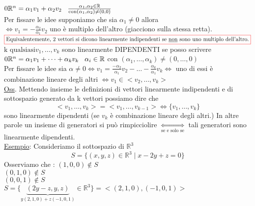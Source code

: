 \(
0\mathbb{R}^n = \alpha_1 v_1 + \alpha_2 v_2 \hspace{.3cm} \frac{\alpha_1,\alpha_2 \in \mathbb{R}}{\text{con} (\alpha_1,\alpha_2) \neq (0,0)}
\)\\
\textsf{\small Per fissare le idee supponiamo che sia $\alpha_1 \neq 0$ allora}\\
$\Leftrightarrow v_1 = - \frac{\alpha_2}{\alpha_1}v_2$ uno è multiplo dell'altro (giacciono sulla stessa retta).\\
$\color{red}\boxed{\normalcolor \text{Equivalentemente, 2 vettori si dicono linearmente indipendenti se \underline{non} sono uno multiplo dell'altro.}}$\\

$\boxed{\text{k qualsiasi}} v_1, \dots, v_k $ sono linearmente DIPENDENTI se posso scrivere $0\mathbb{R}^n = \alpha_1 v_1 + \dots + \alpha_k v_k \hspace{0.3cm} \alpha_i \in \mathbb{R}$ con $ (\alpha_1,\dots,\alpha_k) \neq (0,\dots,0)$\\
\textsf{\small Per fissare le idee sia $\alpha \neq 0 \Leftrightarrow v_1 = \frac{-\alpha_2}{\alpha_1}v_2 - \dots - \frac{\alpha_k}{\alpha_1}v_k \Leftrightarrow$ uno di essi è combinazione lineare degli altri $\Leftrightarrow v_1 \in <v_2,\dots,v_k>$}\\
\textsf{\small \underline{Oss}. Mettendo insieme le definizioni di vettori linearmente indipendenti e di sottospazio generato da k vettori possiamo dire che}
\[
<v_1,\dots,v_k> = <v_1,\dots,v_{k-1}> \Leftrightarrow \{ v_1, \dots, v_k\}
\]
\textsf{\small sono linearmente dipendenti (se $v_k$ è combinazione lineare degli altri.) In altre parole un insieme di generatori si può rimpicciolire $\underset{\text{se e solo se}}{\Leftrightarrow}$ tali generatori sono linearmente dipendenti.}\\
\textsf{\small \underline{Esempio}: Consideriamo il sottospazio di $\mathbb{R}^3$}\\
\[
S = \{ (x,y,z) \in \mathbb{R}^3 \mid x - 2y + z = 0\}
\]
\textsf{\small Osserviamo che : } \centering$(1,0,0) \notin S$\\
$(0,1,0) \notin S$ \\
$(0,0,1) \notin S$ \\
\flushleft
\(
S = \{ \underbrace{(2y - z, y, z)} _{y(2,1,0) + z(-1,0,1)} \in \mathbb{R}^3\} = <(2,1,0),(-1,0,1)>
\)\\

